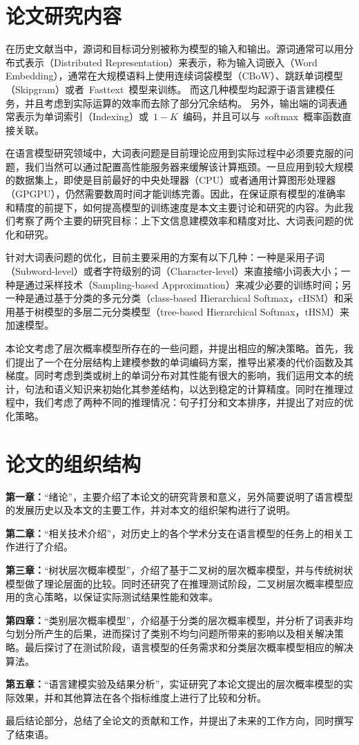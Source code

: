 \section{论文研究内容}
在历史文献当中，源词和目标词分别被称为模型的输入和输出。源词通常可以用分布式表示（Distributed Representation）来表示，称为输入词嵌入（Word Embedding），通常在大规模语料上使用连续词袋模型（CBoW）、跳跃单词模型（Skipgram）或者~Fasttext~模型来训练。
而这几种模型均起源于语言建模任务，并且考虑到实际运算的效率而去除了部分冗余结构。
另外，输出端的词表通常表示为单词索引（Indexing）或~$1-K$~编码，并且可以与~softmax~概率函数直接关联。

在语言模型研究领域中，大词表问题是目前理论应用到实际过程中必须要克服的问题，我们当然可以通过配置高性能服务器来缓解该计算瓶颈。一旦应用到较大规模的数据集上，即使是目前最好的中央处理器（CPU）或者通用计算图形处理器（GPGPU），仍然需要数周时间才能训练完善。因此，在保证原有模型的准确率和精度的前提下，如何提高模型的训练速度是本文主要讨论和研究的内容。为此我们考察了两个主要的研究目标：上下文信息建模效率和精度对比、大词表问题的优化和研究。

针对大词表问题的优化，目前主要采用的方案有以下几种：一种是采用子词（Subword-level）或者字符级别的词（Character-level）来直接缩小词表大小；一种是通过采样技术（Sampling-based Approximation）来减少必要的训练时间；另一种是通过基于分类的多元分类（class-based Hierarchical Softmax，cHSM）和采用基于树模型的多层二元分类模型（tree-based Hierarchical Softmax，tHSM）来加速模型。

本论文考虑了层次概率模型所存在的一些问题，并提出相应的解决策略。首先，我们提出了一个在分层结构上建模参数的单词编码方案，推导出紧凑的代价函数及其梯度。同时考虑到类或树上的单词分布对其性能有很大的影响，我们运用文本的统计，句法和语义知识来初始化其参差结构，以达到稳定的计算精度。同时在推理过程中，我们考虑了两种不同的推理情况：句子打分和文本排序，并提出了对应的优化策略。
\section{论文的组织结构}
\textbf{第一章：}``绪论''，主要介绍了本论文的研究背景和意义，另外简要说明了语言模型的发展历史以及本文的主要工作，并对本文的组织架构进行了说明。

\textbf{第二章：}``相关技术介绍''，对历史上的各个学术分支在语言模型的任务上的相关工作进行了介绍。

\textbf{第三章：}``树状层次概率模型''，介绍了基于二叉树的层次概率模型，并与传统树状模型做了理论层面的比较。同时还研究了在推理测试阶段，二叉树层次概率模型应用的贪心策略，以保证实际测试结果性能和效率。

\textbf{第四章：}``类别层次概率模型''，介绍基于分类的层次概率模型，并分析了词表非均匀划分所产生的后果，进而探讨了类别不均匀问题所带来的影响以及相关解决策略。最后探讨了在测试阶段，语言模型的任务需求和分类层次概率模型相应的解决算法。

\textbf{第五章：}``语言建模实验及结果分析''，实证研究了本论文提出的层次概率模型的实际效果，并和其他算法在各个指标维度上进行了比较和分析。

最后结论部分，总结了全论文的贡献和工作，并提出了未来的工作方向，同时撰写了结束语。



